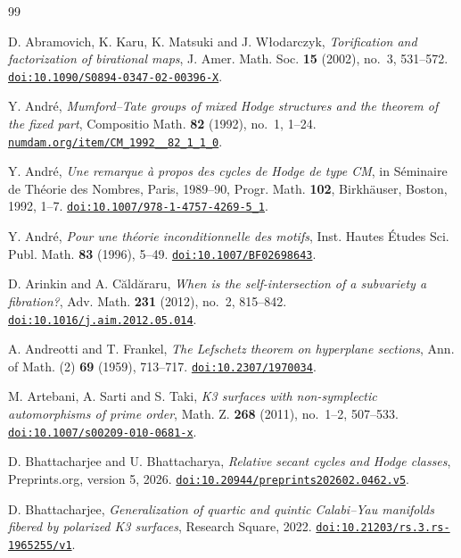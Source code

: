 \documentclass[11pt,reqno]{amsart}
\numberwithin{equation}{section}
\theoremstyle{plain}
\theoremstyle{definition}
\begin{document}
\begin{thebibliography}{99}\raggedright
\setlength{\itemsep}{0.4pt plus 0.2pt}

D. Abramovich, K. Karu, K. Matsuki and J. W\l{}odarczyk,
\emph{Torification and factorization of birational maps},
J. Amer. Math. Soc. \textbf{15} (2002), no.~3, 531--572.
\href{https://doi.org/10.1090/S0894-0347-02-00396-X}{\nolinkurl{doi:10.1090/S0894-0347-02-00396-X}}.

Y. Andr\'e,
\emph{Mumford--Tate groups of mixed Hodge structures and the theorem of the
fixed part},
Compositio Math. \textbf{82} (1992), no.~1, 1--24.
\href{http://www.numdam.org/item/CM_1992__82_1_1_0/}{\nolinkurl{numdam.org/item/CM_1992__82_1_1_0}}.

Y. Andr\'e,
\emph{Une remarque \`a propos des cycles de Hodge de type CM},
in S\'eminaire de Th\'eorie des Nombres, Paris, 1989--90, Progr. Math. \textbf{102}, Birkh\"auser, Boston, 1992, 1--7.
\href{https://doi.org/10.1007/978-1-4757-4269-5_1}{\nolinkurl{doi:10.1007/978-1-4757-4269-5_1}}.

Y. Andr\'e,
\emph{Pour une th\'eorie inconditionnelle des motifs},
Inst. Hautes \'Etudes Sci. Publ. Math. \textbf{83} (1996), 5--49.
\href{https://doi.org/10.1007/BF02698643}{\nolinkurl{doi:10.1007/BF02698643}}.

D. Arinkin and A. C\u{a}ld\u{a}raru,
\emph{When is the self-intersection of a subvariety a fibration?},
Adv. Math. \textbf{231} (2012), no.~2, 815--842.
\href{https://doi.org/10.1016/j.aim.2012.05.014}{\nolinkurl{doi:10.1016/j.aim.2012.05.014}}.

A. Andreotti and T. Frankel,
\emph{The Lefschetz theorem on hyperplane sections},
Ann. of Math. (2) \textbf{69} (1959), 713--717.
\href{https://doi.org/10.2307/1970034}{\nolinkurl{doi:10.2307/1970034}}.

M. Artebani, A. Sarti and S. Taki,
\emph{K3 surfaces with non-symplectic automorphisms of prime order},
Math. Z. \textbf{268} (2011), no.~1--2, 507--533.
\href{https://doi.org/10.1007/s00209-010-0681-x}{\nolinkurl{doi:10.1007/s00209-010-0681-x}}.

D. Bhattacharjee and U. Bhattacharya,
\emph{Relative secant cycles and Hodge classes},
Preprints.org, version 5, 2026.
\href{https://doi.org/10.20944/preprints202602.0462.v5}{\nolinkurl{doi:10.20944/preprints202602.0462.v5}}.

D. Bhattacharjee,
\emph{Generalization of quartic and quintic Calabi--Yau manifolds fibered by polarized K3 surfaces},
Research Square, 2022.
\href{https://doi.org/10.21203/rs.3.rs-1965255/v1}{\nolinkurl{doi:10.21203/rs.3.rs-1965255/v1}}.


\end{thebibliography}
\end{document}
